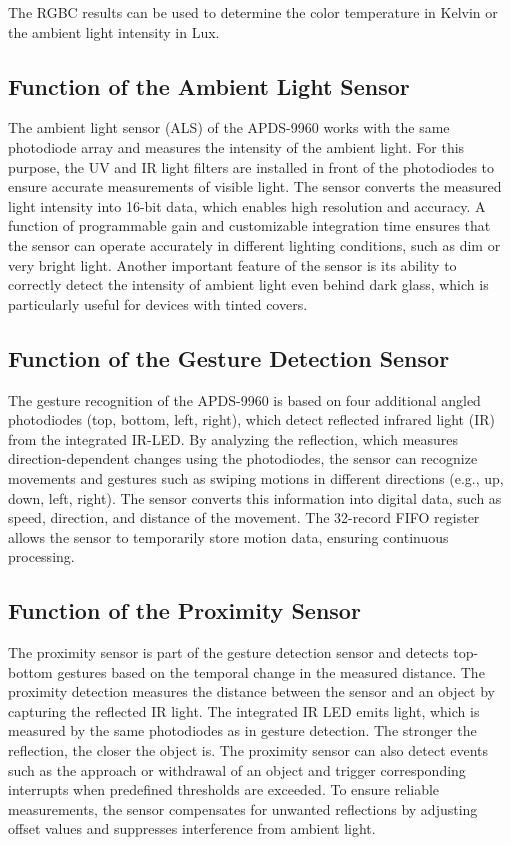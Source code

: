 The RGBC results can be used to determine the color temperature in Kelvin or the ambient light intensity in Lux.

\cite{Avago:2015}

\subsection{Function of the Ambient Light Sensor}

The ambient light sensor (ALS) of the APDS-9960 works with the same photodiode array and measures the intensity of the ambient light. For this purpose, the UV and IR light filters are installed in front of the photodiodes to ensure accurate measurements of visible light. The sensor converts the measured light intensity into 16-bit data, which enables high resolution and accuracy. A function of programmable gain and customizable integration time ensures that the sensor can operate accurately in different lighting conditions, such as dim or very bright light.
\medskip
Another important feature of the sensor is its ability to correctly detect the intensity of ambient light even behind dark glass, which is particularly useful for devices with tinted covers.
\smallskip
\cite{Avago:2015}

\subsection{Function of the Gesture Detection Sensor}

The gesture recognition of the APDS-9960 is based on four additional angled photodiodes (top, bottom, left, right), which detect reflected infrared light (IR) from the integrated IR-LED. By analyzing the reflection, which measures direction-dependent changes using the photodiodes, the sensor can recognize movements and gestures such as swiping motions in different directions (e.g., up, down, left, right). The sensor converts this information into digital data, such as speed, direction, and distance of the movement. The 32-record FIFO register allows the sensor to temporarily store motion data, ensuring continuous processing.
\smallskip
\cite{Avago:2015}

\subsection{Function of the Proximity Sensor}

The proximity sensor is part of the gesture detection sensor and detects top-bottom gestures based on the temporal change in the measured distance. The proximity detection measures the distance between the sensor and an object by capturing the reflected IR light. The integrated IR LED emits light, which is measured by the same photodiodes as in gesture detection. The stronger the reflection, the closer the object is. The proximity sensor can also detect events such as the approach or withdrawal of an object and trigger corresponding interrupts when predefined thresholds are exceeded. To ensure reliable measurements, the sensor compensates for unwanted reflections by adjusting offset values and suppresses interference from ambient light.
\smallskip
\cite{Avago:2015}

